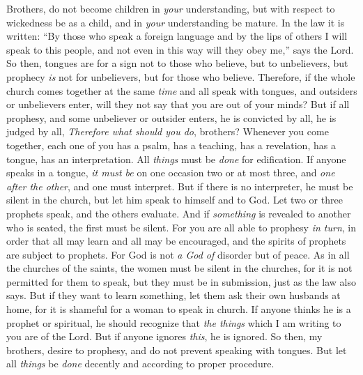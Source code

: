 \begin{biblechapter}
\verse Brothers, do not become children in \textit{your} understanding, but with respect to wickedness be as a child, and in \textit{your} understanding be mature.
\verse In the law it is written: “By those who speak a foreign language 
and by the lips of others 
I will speak to this people, 
and not even in this way will they obey me,”
\verse says the Lord.
\verse So then, tongues are for a sign not to those who believe, but to unbelievers, but prophecy \textit{is} not for unbelievers, but for those who believe.
\verse Therefore, if the whole church comes together at the same \textit{time} and all speak with tongues, and outsiders or unbelievers enter, will they not say that you are out of your minds?
\verse But if all prophesy, and some unbeliever or outsider enters, he is convicted by all, he is judged by all,
 \textit{Therefore what should you do}, brothers? Whenever you come together, each one of you has a psalm, has a teaching, has a revelation, has a tongue, has an interpretation. All \textit{things} must be \textit{done} for edification.
\verse If anyone speaks in a tongue, \textit{it must be} on one occasion two or at most three, and \textit{one after the other}, and one must interpret.
\verse But if there is no interpreter, he must be silent in the church, but let him speak to himself and to God.
\verse Let two or three prophets speak, and the others evaluate.
\verse And if \textit{something} is revealed to another who is seated, the first must be silent.
\verse For you are all able to prophesy \textit{in turn}, in order that all may learn and all may be encouraged,
\verse and the spirits of prophets are subject to prophets.
\verse For God is not \textit{a God of} disorder but of peace.
\verse As in all the churches of the saints,
\verse the women must be silent in the churches, for it is not permitted for them to speak, but they must be in submission, just as the law also says.
\verse But if they want to learn something, let them ask their own husbands at home, for it is shameful for a woman to speak in church.
\verse If anyone thinks he is a prophet or spiritual, he should recognize that \textit{the things} which I am writing to you are of the Lord.
\verse But if anyone ignores \textit{this}, he is ignored.
\verse So then, my brothers, desire to prophesy, and do not prevent speaking with tongues.
\verse But let all \textit{things} be \textit{done} decently and according to proper procedure.
\end{biblechapter}

